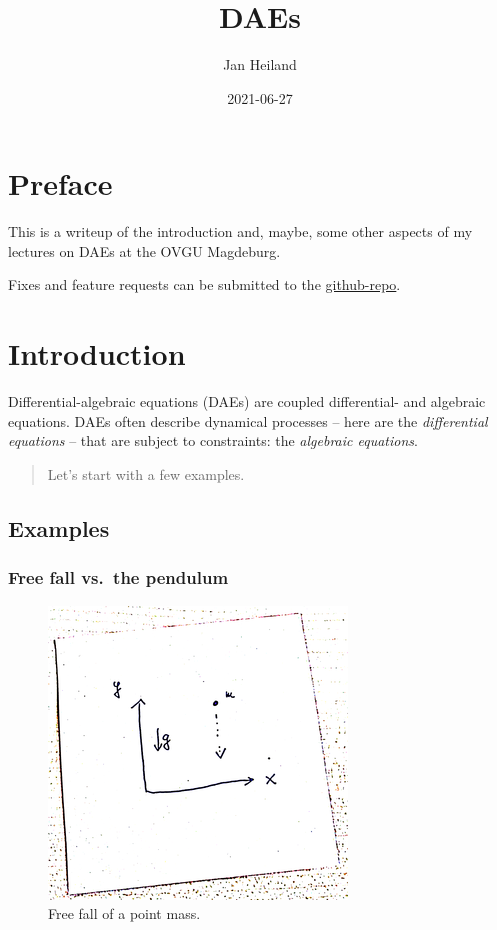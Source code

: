 \documentclass[]{book}
\title{DAEs}
\author{Jan Heiland}
\institute{OVGU/MPI}
\date{2021-06-27}
\newenvironment {JHSAYS} [0] {\begin{quote}\color{jhsc}} {\end{quote}}
\theoremstyle{definition}
\theoremstyle{definition}
\theoremstyle{definition}
\theoremstyle{definition}
\theoremstyle{remark}
\begin{document}
\maketitle

{
\setcounter{tocdepth}{1}
\tableofcontents
}
\hypertarget{preface}{%
\chapter*{Preface}\label{preface}}

This is a writeup of the introduction and, maybe, some other aspects of my lectures on DAEs at the OVGU Magdeburg.

Fixes and feature requests can be submitted to the \href{https://github.com/highlando/script-daes}{github-repo}.

\newcommand{\ind}{\operatorname{ind}}
\newcommand{\rank}{\operatorname{rank}}

\hypertarget{introduction}{%
\chapter{Introduction}\label{introduction}}

Differential-algebraic equations (DAEs) are coupled differential- and algebraic equations. DAEs often describe dynamical processes -- here are the \emph{differential equations} -- that are subject to constraints: the \emph{algebraic equations}.

\begin{JHSAYS}
Let's start with a few examples.
\end{JHSAYS}

\hypertarget{examples}{%
\section{Examples}\label{examples}}

\hypertarget{free-fall-vs.-the-pendulum}{%
\subsection*{Free fall vs.~the pendulum}\label{free-fall-vs.-the-pendulum}}

\begin{figure}

{\centering \includegraphics[width=0.4\linewidth]{pics/freefall} 

}

\caption{Free fall of a point mass.}\label{fig:free-fall}
\end{figure}
\end{document}
